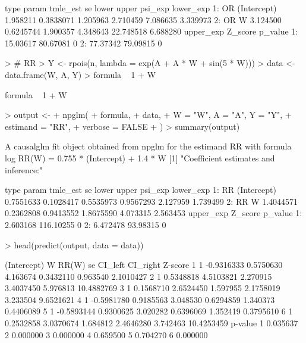 \documentclass[article]{jss}
\begin{document}
\begin{Schunk}
\begin{Soutput}
   type       param tmle_est        se    lower    upper   psi_exp lower_exp
1:   OR (Intercept) 1.958211 0.3838071 1.205963 2.710459  7.086635  3.339973
2:   OR           W 3.124500 0.6245744 1.900357 4.348643 22.748518  6.688280
   upper_exp  Z_score p_value
1:  15.03617 80.67081       0
2:  77.37342 79.09815       0
\end{Soutput}
\begin{Sinput}
> # RR
> Y <- rpois(n, lambda = exp(A + A * W + sin(5 * W)))
> data <- data.frame(W, A, Y)
> formula ~ 1 + W
\end{Sinput}
\begin{Soutput}
formula ~ 1 + W
\end{Soutput}
\begin{Sinput}
> output <-
+   npglm(
+     formula,
+     data,
+     W = "W", A = "A", Y = "Y",
+     estimand = "RR",
+     verbose = FALSE
+   )
> summary(output)
\end{Sinput}
\begin{Soutput}
A causalglm fit object obtained from npglm for the estimand RR with formula 
log RR(W) = 0.755 * (Intercept) + 1.4 * W
[1] "Coefficient estimates and inference:"

   type       param  tmle_est        se     lower     upper  psi_exp lower_exp
1:   RR (Intercept) 0.7551633 0.1028417 0.5535973 0.9567293 2.127959  1.739499
2:   RR           W 1.4044571 0.2362808 0.9413552 1.8675590 4.073315  2.563453
   upper_exp   Z_score p_value
1:  2.603168 116.10255       0
2:  6.472478  93.98315       0
\end{Soutput}
\begin{Sinput}
> head(predict(output, data = data))
\end{Sinput}
\begin{Soutput}
  (Intercept)          W     RR(W)       se   CI_left CI_right    Z-score
1           1 -0.9316333 0.5750630 4.163674 0.3432110 0.963540  2.1010427
2           1  0.5348818 4.5103821 2.270915 3.4037450 5.976813 10.4882769
3           1  0.1568710 2.6524450 1.597955 2.1758019 3.233504  9.6521621
4           1 -0.5981780 0.9185563 3.048530 0.6294859 1.340373  0.4406089
5           1 -0.5893144 0.9300625 3.020282 0.6396069 1.352419  0.3795610
6           1  0.2532858 3.0370674 1.684812 2.4646280 3.742463 10.4253459
   p-value
1 0.035637
2 0.000000
3 0.000000
4 0.659500
5 0.704270
6 0.000000
\end{Soutput}
\end{Schunk}
\end{document}
